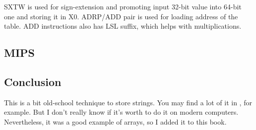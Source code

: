 SXTW is used for sign-extension and promoting input 32-bit value into 64-bit one and storing it in X0.
ADRP/ADD pair is used for loading address of the table.
ADD instructions also has LSL suffix, which helps with multiplications.
\fi

\ifdefined\IncludeMIPS
\subsection{MIPS}

\fi

\subsection{Conclusion}

This is a bit old-school technique to store strings.
You may find a lot of it in \oracle, for example.
But I don't really know if it's worth to do it on modern computers.
Nevertheless, it was a good example of arrays, so I added it to this book.
\fi
